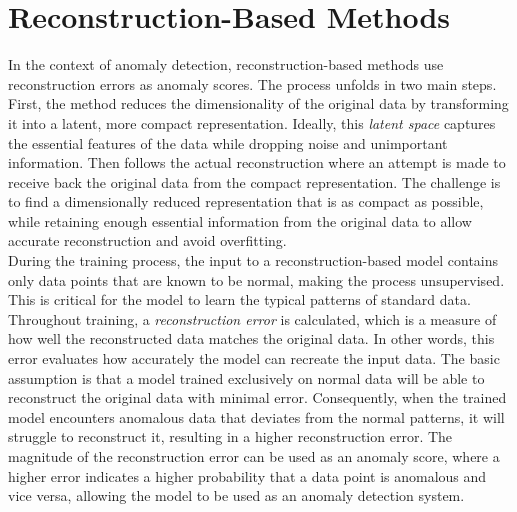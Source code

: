 \section{Reconstruction-Based Methods}
In the context of anomaly detection, reconstruction-based methods use reconstruction errors as anomaly scores. The process unfolds in two main steps. First, the method reduces the dimensionality of the original data by transforming it into a latent, more compact representation. Ideally, this \textit{latent space} captures the essential features of the data while dropping noise and unimportant information. Then follows the actual reconstruction where an attempt is made to receive back the original data from the compact representation. The challenge is to find a dimensionally reduced representation that is as compact as possible, while retaining enough essential information from the original data to allow accurate reconstruction and avoid overfitting.\\
During the training process, the input to a reconstruction-based model contains only data points that are known to be normal, making the process unsupervised. This is critical for the model to learn the typical patterns of standard data. Throughout training, a \textit{reconstruction error} is calculated, which is a measure of how well the reconstructed data matches the original data. In other words, this error evaluates how accurately the model can recreate the input data.  The basic assumption is that a model trained exclusively on normal data will be able to reconstruct the original data with minimal error. Consequently, when the trained model encounters anomalous data that deviates from the normal patterns, it will struggle to reconstruct it, resulting in a higher reconstruction error. The magnitude of the reconstruction error can be used as an anomaly score, where a higher error indicates a higher probability that a data point is anomalous and vice versa, allowing the model to be used as an anomaly detection system.

